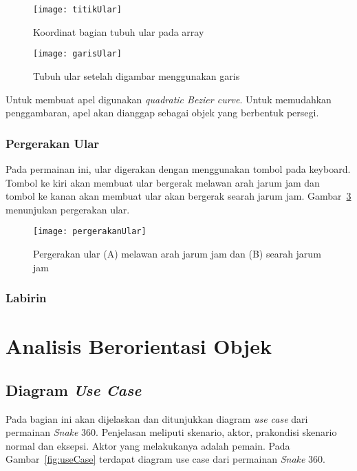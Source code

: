\begin{figure}[H]
	\centering  
	\texttt{[image: titikUlar]}  
	\caption[Koordinat bagian tubuh ular pada array]{Koordinat bagian tubuh ular pada array}
	\label{fig:titikUlar} 
\end{figure}

\begin{figure}[H]
	\centering  
	\texttt{[image: garisUlar]}  
	\caption[Tubuh ular setelah digambar menggunakan garis]{Tubuh ular setelah digambar menggunakan garis}
	\label{fig:garisUlar} 
\end{figure}

Untuk membuat apel digunakan \textit{quadratic Bezier curve}. Untuk memudahkan penggambaran, apel akan dianggap sebagai objek yang berbentuk persegi. 

\subsubsection{Pergerakan Ular}
Pada permainan ini, ular digerakan dengan menggunakan tombol pada keyboard. Tombol ke kiri akan membuat ular bergerak melawan arah jarum jam dan tombol ke kanan akan membuat ular akan bergerak searah jarum jam. Gambar~\ref{fig:pergerakanUlar} menunjukan pergerakan ular. 

\begin{figure}[H]
	\centering  
	\texttt{[image: pergerakanUlar]}  
	\caption[Pergerakan ular (A) melawan arah jarum jam dan (B) searah jarum jam]{Pergerakan ular (A) melawan arah jarum jam dan (B) searah jarum jam}
	\label{fig:pergerakanUlar} 
\end{figure}



\subsubsection{Labirin}


\section{Analisis Berorientasi Objek}

\subsection{Diagram \textit{Use Case}}
Pada bagian ini akan dijelaskan dan ditunjukkan diagram \textit{use case} dari permainan \textit{Snake} 360. Penjelasan meliputi skenario, aktor, prakondisi skenario normal dan eksepsi. Aktor yang melakukanya adalah pemain. Pada Gambar~\ref{fig:useCase} terdapat diagram use case dari permainan \textit{Snake} 360.


